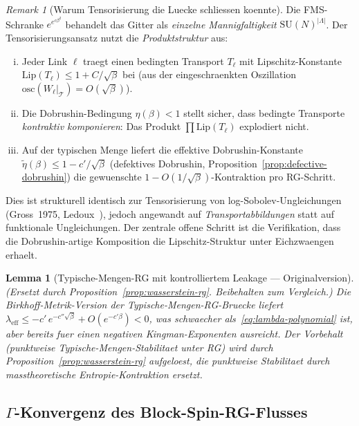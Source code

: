 \documentclass[12pt,a4paper]{article}
\theoremstyle{definition}
\theoremstyle{plain}
\newtheorem{lemma}[definition]{Lemma}
\theoremstyle{remark}
\newtheorem{remark}[definition]{Remark}
\begin{document}
\begin{remark}[Warum Tensorisierung die Luecke schliessen koennte]
\label{rem:tensorisation-mechanism}
Die FMS-Schranke $e^{e^{c\beta^2}}$ behandelt das Gitter als
\emph{einzelne Mannigfaltigkeit} $\mathrm{SU}(N)^{|\Lambda|}$.
Der Tensorisierungsansatz nutzt die \emph{Produktstruktur} aus:
\begin{enumerate}[(i)]
\item Jeder Link $\ell$ traegt einen bedingten Transport $T_\ell$
  mit Lipschitz-Konstante $\mathrm{Lip}(T_\ell) \leq 1 + C/\sqrt{\beta}$
  bei (aus der eingeschraenkten Oszillation $\mathrm{osc}(W_\ell|_{\mathcal{T}}) = O(\sqrt{\beta})$).
\item Die Dobrushin-Bedingung $\eta(\beta) < 1$ stellt sicher, dass
  bedingte Transporte \emph{kontraktiv komponieren}:
  Das Produkt $\prod \mathrm{Lip}(T_\ell)$ explodiert nicht.
\item Auf der typischen Menge liefert die effektive Dobrushin-Konstante
  $\tilde{\eta}(\beta) \leq 1 - c'/\sqrt{\beta}$ (defektives Dobrushin,
  Proposition~\ref{prop:defective-dobrushin})
  die gewuenschte $1 - O(1/\sqrt{\beta})$-Kontraktion pro RG-Schritt.
\end{enumerate}
Dies ist strukturell identisch zur Tensorisierung von log-Sobolev-Ungleichungen
(Gross~1975, Ledoux~\cite{Ledoux2001}), jedoch angewandt auf
\emph{Transportabbildungen} statt auf funktionale Ungleichungen.
Der zentrale offene Schritt ist die Verifikation, dass die Dobrushin-artige
Komposition die Lipschitz-Struktur unter Eichzwaengen erhaelt.
\end{remark}

\begin{lemma}[Typische-Mengen-RG mit kontrolliertem Leakage --- Originalversion]\label{lem:typical-rg-old}
\emph{(Ersetzt durch Proposition~\ref{prop:wasserstein-rg}.
Beibehalten zum Vergleich.)}
Die Birkhoff-Metrik-Version der Typische-Mengen-RG-Bruecke
liefert $\lambda_{\mathrm{eff}} \leq -c'\,e^{-c''\sqrt{\beta}} + O(e^{-c'\beta}) < 0$,
was schwaecher als~\eqref{eq:lambda-polynomial} ist, aber bereits fuer
einen negativen Kingman-Exponenten ausreicht.
Der Vorbehalt (punktweise Typische-Mengen-Stabilitaet unter RG) wird durch
Proposition~\ref{prop:wasserstein-rg} aufgeloest, die punktweise Stabilitaet
durch masstheoretische Entropie-Kontraktion ersetzt.
\end{lemma}

\subsection{\texorpdfstring{$\Gamma$}{Gamma}-Konvergenz des Block-Spin-RG-Flusses}\label{sec:gamma-rg}
\end{document}
